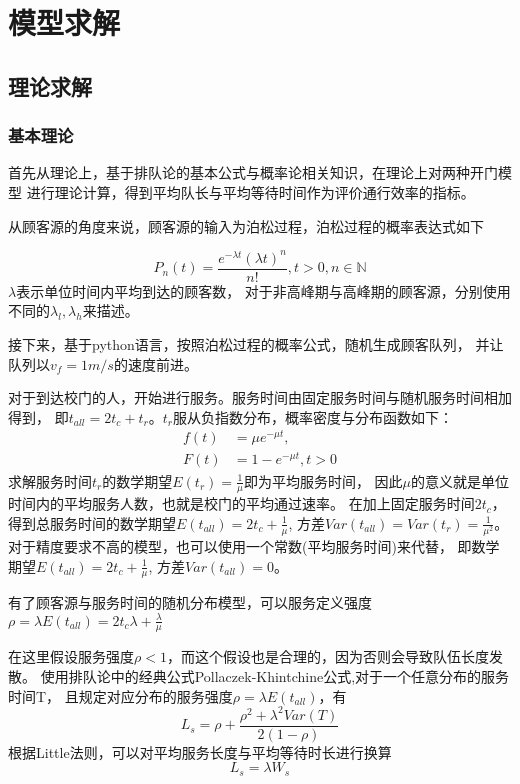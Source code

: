 \section{模型求解}

\subsection{理论求解}

\subsubsection{基本理论}
    首先从理论上，基于排队论的基本公式与概率论相关知识，在理论上对两种开门模型
    进行理论计算，得到平均队长与平均等待时间作为评价通行效率的指标。

    从顾客源的角度来说，顾客源的输入为泊松过程，泊松过程的概率表达式如下

    \begin{equation}
        P_n(t)=\frac{e^{-\lambda t}(\lambda t)^n}{n!},t>0,n \in \mathbb{N}
    \end{equation}
    $\lambda$表示单位时间内平均到达的顾客数，
    对于非高峰期与高峰期的顾客源，分别使用不同的$\lambda_l,\lambda_h$来描述。

    接下来，基于python语言，按照泊松过程的概率公式，随机生成顾客队列，
    并让队列以$v_f=1 m/s$的速度前进。

    对于到达校门的人，开始进行服务。服务时间由固定服务时间与随机服务时间相加得到，
    即$t_{all}=2t_{c}+t_{r}$。$t_r$服从负指数分布，概率密度与分布函数如下：
    \begin{equation}
        \begin{aligned}
            f(t) &=\mu e^{-\mu t},  \\
            F(t) &=1-e^{-\mu t},t>0
        \end{aligned}
    \end{equation}
    求解服务时间$t_r$的数学期望$E(t_r)=\frac{1}{\mu}$即为平均服务时间，
    因此$\mu$的意义就是单位时间内的平均服务人数，也就是校门的平均通过速率。
    在加上固定服务时间$2t_c$，得到总服务时间的数学期望$E(t_{all})=2t_c+\frac{1}{\mu}$,
    方差$ Var(t_{all})=Var(t_r)=\frac{1}{\mu^2}$。
    对于精度要求不高的模型，也可以使用一个常数(平均服务时间)来代替，
    即数学期望$E(t_{all})=2t_c+\frac{1}{\mu}$,
    方差$ Var(t_{all})=0$。

    有了顾客源与服务时间的随机分布模型，可以服务定义强度
    $\rho=\lambda E(t_{all})=2t_c \lambda+\frac{\lambda}{\mu}$

    在这里假设服务强度$\rho<1$，而这个假设也是合理的，因为否则会导致队伍长度发散。
    使用排队论中的经典公式Pollaczek-Khintchine公式,对于一个任意分布的服务时间T，
    且规定对应分布的服务强度$\rho=\lambda E(t_{all})$，有
    \begin{equation}
        L_s=\rho +\frac{\rho^2 +\lambda^2 Var(T)}{2(1-\rho)}
    \end{equation}
    根据Little法则，可以对平均服务长度与平均等待时长进行换算
    \begin{equation}
        L_s=\lambda W_s
    \end{equation}


